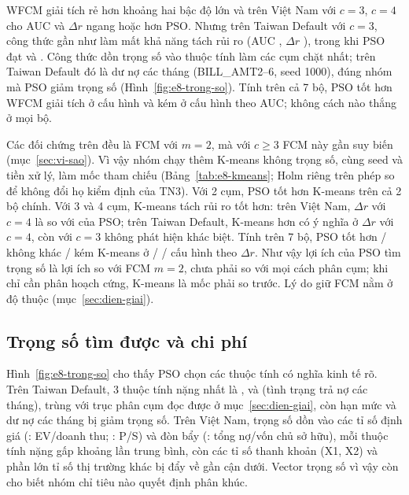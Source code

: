 WFCM giải tích rẻ hơn khoảng hai bậc độ lớn và trên Việt Nam với $c = 3$,
$c = 4$ cho AUC và $\Delta r$ ngang hoặc hơn PSO. Nhưng trên Taiwan Default với $c = 3$, công thức gần như làm mất khả năng
tách rủi ro (AUC \soLieuETamTaiwanKiemChungCBaWfcmGiaiTichAucCung, $\Delta r$
\soLieuETamTaiwanKiemChungCBaWfcmGiaiTichChenhTiLe), trong khi PSO đạt \soLieuETamTaiwanKiemChungCBaPsoTrongSoAucCung{} và
\soLieuETamTaiwanKiemChungCBaPsoTrongSoChenhTiLe. Công thức dồn trọng số vào thuộc tính làm các cụm chặt nhất; trên Taiwan
Default đó là dư nợ các tháng (BILL\_AMT2--6, seed 1000), đúng nhóm mà PSO giảm trọng số (Hình~\ref{fig:e8-trong-so}). Tính
trên cả 7 bộ, PSO tốt hơn WFCM giải tích ở \soLieuETamAucCungWfcmGiaiTichHon{} cấu hình và kém ở
\soLieuETamAucCungWfcmGiaiTichKem{} cấu hình theo AUC; không cách nào thắng ở mọi bộ.

Các đối chứng trên đều là FCM với $m = 2$, mà với $c \ge 3$ FCM này gần suy biến (mục~\ref{sec:vi-sao}). Vì vậy nhóm chạy
thêm K-means không trọng số, cùng seed và tiền xử lý, làm mốc tham chiếu (Bảng~\ref{tab:e8-kmeans}; Holm riêng trên
\soLieuETamKmSoPhep{} phép so để không đổi họ kiểm định của TN3). Với 2 cụm, PSO tốt hơn K-means trên cả 2 bộ chính. Với
3 và 4 cụm, K-means tách rủi ro tốt hơn: trên Việt Nam, $\Delta r$ với $c = 4$ là \soLieuETamKmVietNamCBonChenhTiLe{} so
với \soLieuETamVietNamCBonPsoTrongSoChenhTiLe{} của PSO; trên Taiwan Default, K-means hơn có ý nghĩa ở $\Delta r$ với $c = 4$,
còn với $c = 3$ không phát hiện khác biệt. Tính trên 7 bộ, PSO tốt hơn / không khác / kém K-means ở
\soLieuETamKmChenhTiLeHon{} / \soLieuETamKmChenhTiLeBang{} / \soLieuETamKmChenhTiLeKem{} cấu hình theo $\Delta r$. Như vậy lợi
ích của PSO tìm trọng số là lợi ích so với FCM $m = 2$, chưa phải so với mọi cách phân cụm; khi chỉ cần phân hoạch cứng,
K-means là mốc phải so trước. Lý do giữ FCM nằm ở độ thuộc (mục~\ref{sec:dien-giai}).



\subsection{Trọng số tìm được và chi phí}

Hình~\ref{fig:e8-trong-so} cho thấy PSO chọn các thuộc tính có nghĩa kinh tế rõ. Trên Taiwan
Default, 3 thuộc tính nặng nhất là \soLieuETamTaiwanKiemChungTrongSoCaoMotTen, \soLieuETamTaiwanKiemChungTrongSoCaoHaiTen{} và
\soLieuETamTaiwanKiemChungTrongSoCaoBaTen{} (tình trạng trả nợ các tháng), trùng với trục phân cụm đọc được ở
mục~\ref{sec:dien-giai}, còn hạn mức và dư nợ các tháng bị giảm trọng số. Trên Việt Nam, trọng số dồn vào các tỉ số định giá
(\soLieuETamVietNamTrongSoCaoMotTen: EV/doanh thu; \soLieuETamVietNamTrongSoCaoBaTen: P/S) và đòn bẩy
(\soLieuETamVietNamTrongSoCaoHaiTen: tổng nợ/vốn chủ sở hữu), mỗi thuộc tính nặng gấp khoảng
\soLieuETamVietNamTrongSoCaoMotGiaTri{} lần trung bình, còn các tỉ số thanh khoản (X1, X2) và phần lớn tỉ số thị trường khác
bị đẩy về gần cận dưới. Vector trọng số vì vậy còn cho biết nhóm chỉ tiêu nào quyết định phân khúc.

